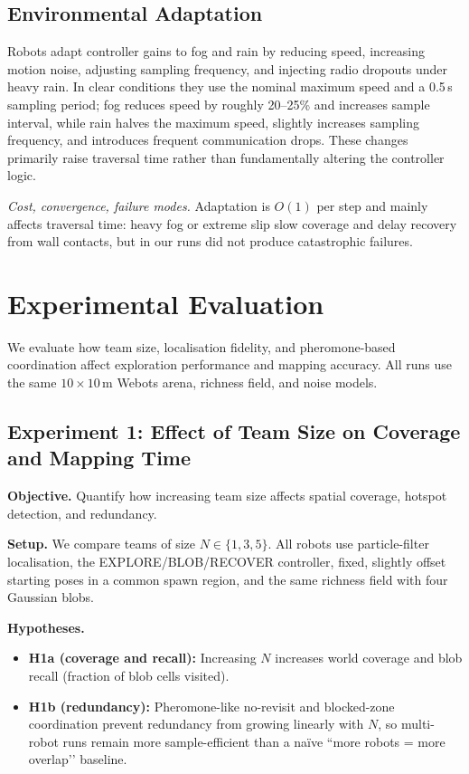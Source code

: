 \documentclass[lettersize,journal]{IEEEtran}
\begin{document}
\subsection{Environmental Adaptation }

Robots adapt controller gains to fog and rain by reducing speed, increasing
motion noise, adjusting sampling frequency, and injecting radio dropouts under
heavy rain. In clear conditions they use the nominal maximum speed and a
0.5\,s sampling period; fog reduces speed by roughly 20--25\% and increases
sample interval, while rain halves the maximum speed, slightly increases
sampling frequency, and introduces frequent communication drops. These changes
primarily raise traversal time rather than fundamentally altering the controller
logic.

\textit{Cost, convergence, failure modes.}
Adaptation is $O(1)$ per step and mainly affects traversal time: heavy fog or
extreme slip slow coverage and delay recovery from wall contacts, but in our
runs did not produce catastrophic failures.


\section{Experimental Evaluation}

We evaluate how team size, localisation fidelity, and pheromone-based
coordination affect exploration performance and mapping accuracy. All runs use
the same $10\times10\,\mathrm{m}$ Webots arena, richness field, and noise
models.

\subsection{Experiment 1: Effect of Team Size on Coverage and Mapping Time }

\textbf{Objective.}
Quantify how increasing team size affects spatial coverage, hotspot detection,
and redundancy.

\textbf{Setup.}
We compare teams of size $N \in \{1,3,5\}$. All robots use
particle-filter localisation, the EXPLORE/BLOB/RECOVER controller, fixed,
slightly offset starting poses in a common spawn region, and the same richness
field with four Gaussian blobs.

\textbf{Hypotheses.}
\begin{itemize}
    \item \textbf{H1a (coverage and recall):} Increasing $N$ increases world
    coverage and blob recall (fraction of blob cells visited).
    \item \textbf{H1b (redundancy):} Pheromone-like no-revisit and blocked-zone
    coordination prevent redundancy from growing linearly with $N$, so
    multi-robot runs remain more sample-efficient than a naïve
    “more robots = more overlap’’ baseline.
\end{itemize}
\end{document}
